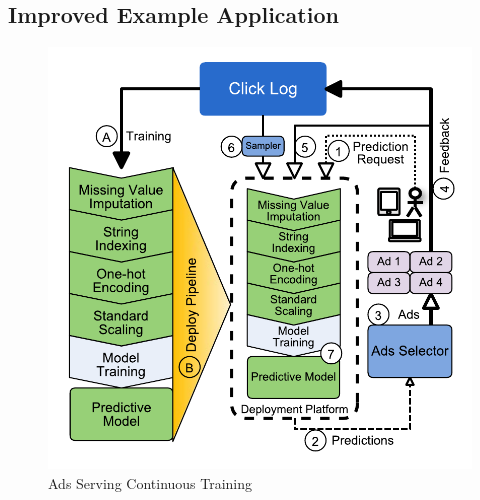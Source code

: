 \subsection{Improved Example Application}
\begin{figure}[t]
\centering
\includegraphics[width=\columnwidth]{../images/improved-example-vertical.pdf}
\caption{Ads Serving Continuous Training}
\label{fig:improved-example}
\end{figure}

